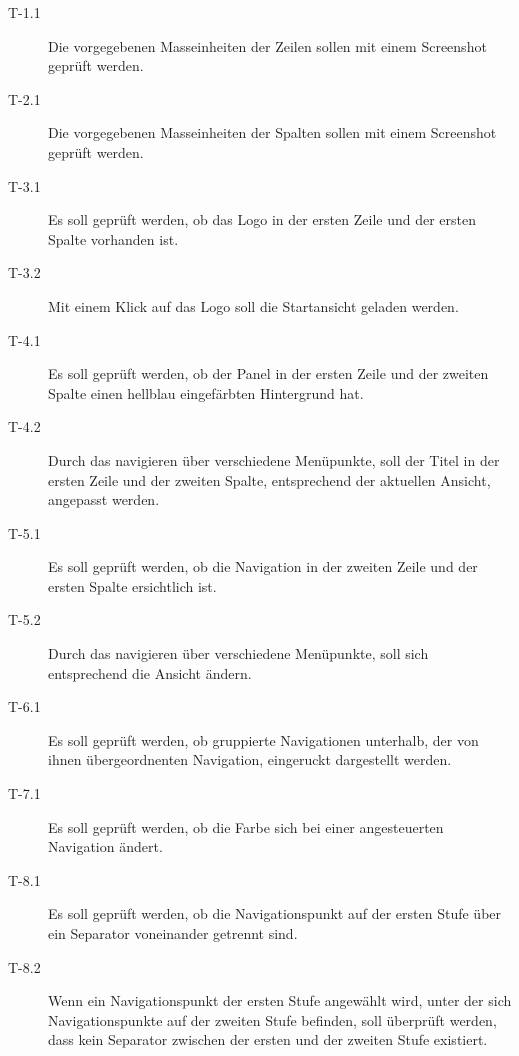 \begin{description}
\item[T-1.1\label{itm:T-1.1}]
Die vorgegebenen Masseinheiten der Zeilen sollen mit einem Screenshot geprüft werden.

\item[T-2.1\label{itm:T-2.1}]
Die vorgegebenen Masseinheiten der Spalten sollen mit einem Screenshot geprüft werden.

\item[T-3.1\label{itm:T-3.1}]
Es soll geprüft werden, ob das Logo in der ersten Zeile und der ersten Spalte
vorhanden ist.

\item[T-3.2\label{itm:T-3.2}]
Mit einem Klick auf das Logo soll die Startansicht geladen werden.

\item[T-4.1\label{itm:T-4.1}]
Es soll geprüft werden, ob der Panel in der ersten Zeile und der zweiten Spalte
einen hellblau eingefärbten Hintergrund hat.

\item[T-4.2\label{itm:T-4.2}]
Durch das navigieren über verschiedene Menüpunkte, soll der Titel in der ersten
Zeile und der zweiten Spalte, entsprechend der aktuellen Ansicht, angepasst
werden.

\item[T-5.1\label{itm:T-5.1}]
Es soll geprüft werden, ob die Navigation in der zweiten Zeile und der
ersten Spalte ersichtlich ist.

\item[T-5.2\label{itm:T-5.2}]
Durch das navigieren über verschiedene Menüpunkte, soll sich entsprechend die
Ansicht ändern.

\item[T-6.1\label{itm:T-6.1}]
Es soll geprüft werden, ob gruppierte Navigationen unterhalb, der von ihnen
übergeordnenten Navigation, eingeruckt dargestellt werden.

\item[T-7.1\label{itm:T-7.1}]
Es soll geprüft werden, ob die Farbe sich bei einer angesteuerten Navigation
ändert.

\item[T-8.1\label{itm:T-8.1}]
Es soll geprüft werden, ob die Navigationspunkt auf der ersten Stufe über ein
Separator voneinander getrennt sind.

\item[T-8.2\label{itm:T-8.2}]
Wenn ein Navigationspunkt der ersten Stufe angewählt wird, unter der sich
Navigationspunkte auf der zweiten Stufe befinden, soll überprüft werden, dass
kein Separator zwischen der ersten und der zweiten Stufe existiert.


\end{description}
